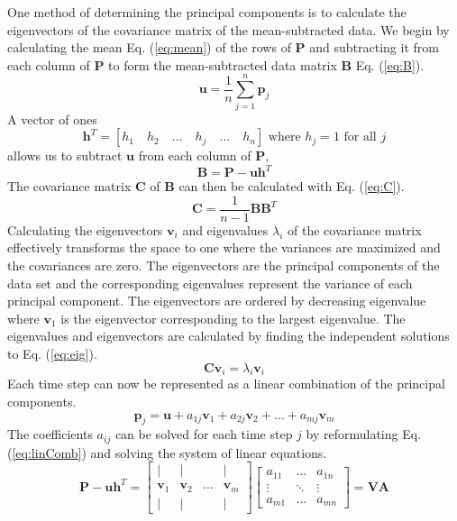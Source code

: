 One method of determining the principal components is to calculate the
eigenvectors of the covariance matrix of the mean-subtracted data. We begin by
calculating the mean Eq. (\ref{eq:mean}) of the rows of $\mathbf{P}$ and
subtracting it from each column of $\mathbf{P}$ to form the mean-subtracted
data matrix $\mathbf{B}$ Eq. (\ref{eq:B}).
\begin{equation}
    \mathbf{u}=\frac{1}{n}\sum_{j=1}^n\mathbf{p}_j
    \label{eq:mean}
\end{equation}
A vector of ones
\begin{displaymath}
    \mathbf{h}^T=\left[h_1\quad h_2\quad\ldots\quad h_j\quad\ldots\quad h_n\right]\textrm{ where }h_j=1\textrm{ for all }j
    \label{eq:h}
\end{displaymath}
allows us to subtract $\mathbf{u}$ from each column of $\mathbf{P}$,
\begin{equation}
    \mathbf{B}=\mathbf{P}-\mathbf{u}\mathbf{h}^T
    \label{eq:B}
\end{equation}
The covariance matrix $\mathbf{C}$ of $\mathbf{B}$ can then be calculated with
Eq. (\ref{eq:C}).
\begin{equation}
    \mathbf{C}=\frac{1}{n-1}\mathbf{B}{\mathbf{B}^T}
    \label{eq:C}
\end{equation}
Calculating the eigenvectors $\mathbf{v}_i$ and eigenvalues $\lambda_i$ of the
covariance matrix effectively transforms the space to one where the variances
are maximized and the covariances are zero. The eigenvectors are the principal
components of the data set and the corresponding eigenvalues represent the
variance of each principal component. The eigenvectors are ordered by
decreasing eigenvalue where $\mathbf{v}_1$ is the eigenvector corresponding to
the largest eigenvalue. The eigenvalues and eigenvectors are calculated by
finding the independent solutions to Eq. (\ref{eq:eig}).
\begin{equation}
    \mathbf{C}\mathbf{v}_i=\lambda_i\mathbf{v}_i
    \label{eq:eig}
\end{equation}
Each time step can now be represented as a linear combination of the principal
components.
\begin{equation}
    \mathbf{p}_j=\mathbf{u}+a_{1j}\mathbf{v}_1+a_{2j}\mathbf{v}_2+\ldots+a_{mj}\mathbf{v}_m
    \label{eq:linComb}
\end{equation}
The coefficients $a_{ij}$ can be solved for each time step $j$ by reformulating
Eq. (\ref{eq:linComb}) and solving the system of linear equations.
\begin{equation}
    \mathbf{P}-\mathbf{u}\mathbf{h}^T=
    \left[\begin{array}{cccc}
        | & | & & |\\
        \mathbf{v}_1 & \mathbf{v}_2 & \ldots & \mathbf{v}_m\\
        | & | & & |
    \end{array}\right]
    \left[\begin{array}{ccc}
    a_{11} & \ldots & a_{1n}\\
    \vdots & \ddots & \vdots\\
    a_{m1} & \ldots & a_{mn}
    \end{array}\right]
    =\mathbf{V}\mathbf{A}
\end{equation}
